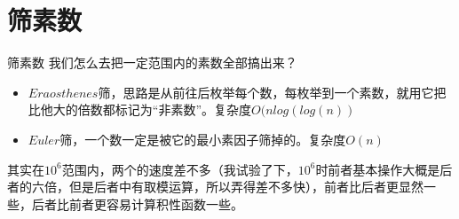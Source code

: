 \documentclass[9pt]{beamer}
\begin{document}
	\section{筛素数} 
		\begin{frame}{筛素数} 
			我们怎么去把一定范围内的素数全部搞出来？
			\begin{itemize}
				\item $Eraosthenes$筛，思路是从前往后枚举每个数，每枚举到一个素数，就用它把比他大的倍数都标记为“非素数”。复杂度$O(nlog(log(n))$
				\item $Euler$筛，一个数一定是被它的最小素因子筛掉的。复杂度$O(n)$
			\end{itemize}
			其实在$10^6$范围内，两个的速度差不多（我试验了下，$10^6$时前者基本操作大概是后者的六倍，但是后者中有取模运算，所以弄得差不多快），前者比后者更显然一些，后者比前者更容易计算积性函数一些。
		\end{frame}
\end{document}
